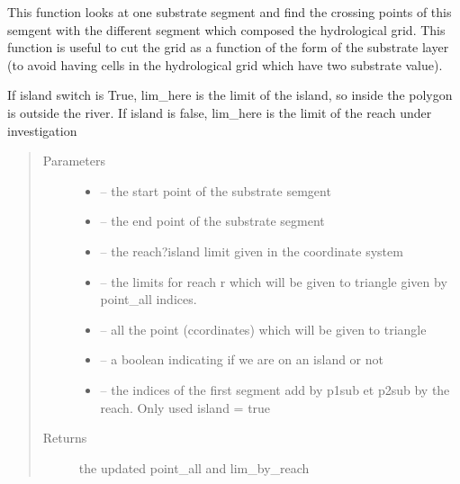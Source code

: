 \documentclass[letterpaper,10pt,english]{sphinxmanual}
\begin{document}
\begin{fulllineitems}
\label{\detokenize{index:src.manage_grid_8.get_crossing_segment_sub}}
This function looks at one substrate segment and find the crossing points of this semgent with the different
segment which composed the hydrological grid. This function is useful to cut the grid as a function of the form
of the substrate layer (to avoid having cells in the hydrological grid which have two substrate value).

If island switch is True, lim\_here is the limit of the island, so
inside the polygon is outside the river. If island is false, lim\_here is the limit of the reach under investigation
\begin{quote}\begin{description}
\item[{Parameters}] \leavevmode\begin{itemize}
\item {} 
 -- the start point of the substrate semgent

\item {} 
 -- the end point of the substrate segment

\item {} 
 -- the reach?island limit given in the coordinate system

\item {} 
 -- the limits for reach r which will be given to triangle given by point\_all indices.

\item {} 
 -- all the point (ccordinates) which will be given to triangle

\item {} 
 -- a boolean indicating if we are on an island or not

\item {} 
 -- the indices of the first segment add by p1sub et p2sub by the reach. Only used island = true

\end{itemize}

\item[{Returns}] \leavevmode
the updated point\_all and lim\_by\_reach

\end{description}\end{quote}

\end{fulllineitems}
\end{document}
